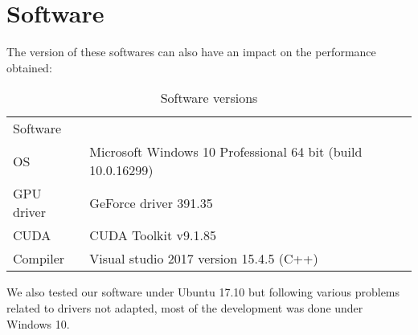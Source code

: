
\section{Software}

The version of these softwares can also have an impact on the performance obtained:

\begin{table}[!ht]
\centering
\caption{Software versions}
\label{my-label}
\begin{tabular}{lll}
Software   &                                                             &  \\
OS         & Microsoft Windows 10 Professional 64 bit (build 10.0.16299) &  \\
GPU driver & GeForce driver 391.35                                       &  \\
CUDA       & CUDA Toolkit v9.1.85                                        &  \\
Compiler   & Visual studio 2017 version 15.4.5 (C++)                     & 
\end{tabular}
\end{table}

We also tested our software under Ubuntu 17.10 but following various problems related to drivers not adapted, most of the development was done under Windows 10.